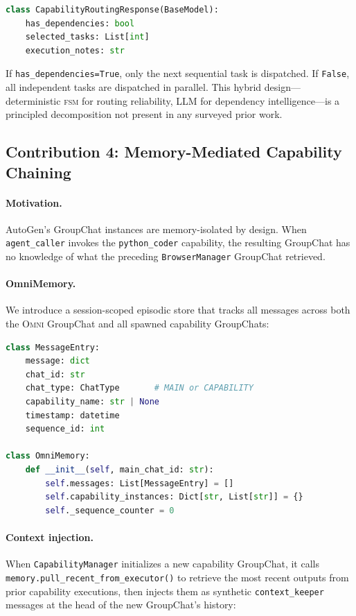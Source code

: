 \documentclass[11pt,a4paper]{article}
\newcommand{\omni}{\textsc{Omni}}
\newcommand{\fsm}{\textsc{fsm}}
\begin{document}
\begin{lstlisting}[language=Python]
class CapabilityRoutingResponse(BaseModel):
    has_dependencies: bool
    selected_tasks: List[int]
    execution_notes: str
\end{lstlisting}

If \texttt{has\_dependencies=True}, only the next sequential task is dispatched. If \texttt{False}, all independent tasks are dispatched in parallel. This hybrid design---deterministic \fsm{} for routing reliability, LLM for dependency intelligence---is a principled decomposition not present in any surveyed prior work.

\subsection{Contribution 4: Memory-Mediated Capability Chaining}
\label{sec:memory}

\paragraph{Motivation.} AutoGen's GroupChat instances are memory-isolated by design. When \texttt{agent\_caller} invokes the \texttt{python\_coder} capability, the resulting GroupChat has no knowledge of what the preceding \texttt{BrowserManager} GroupChat retrieved.

\paragraph{OmniMemory.} We introduce a session-scoped episodic store that tracks all messages across both the \omni{} GroupChat and all spawned capability GroupChats:

\begin{lstlisting}[language=Python]
class MessageEntry:
    message: dict
    chat_id: str
    chat_type: ChatType       # MAIN or CAPABILITY
    capability_name: str | None
    timestamp: datetime
    sequence_id: int

class OmniMemory:
    def __init__(self, main_chat_id: str):
        self.messages: List[MessageEntry] = []
        self.capability_instances: Dict[str, List[str]] = {}
        self._sequence_counter = 0
\end{lstlisting}

\paragraph{Context injection.} When \texttt{CapabilityManager} initializes a new capability GroupChat, it calls \texttt{memory.pull\_recent\_from\_executor()} to retrieve the most recent outputs from prior capability executions, then injects them as synthetic \texttt{context\_keeper} messages at the head of the new GroupChat's history:
\end{document}
